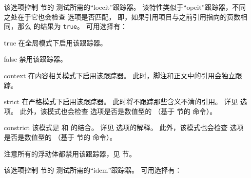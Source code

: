 \begin{optionlist}
该选项控制  节的  测试所需的“loccit”跟踪器。
该特性类似于“opcit”跟踪器，不同之处在于它也会检查  选项是否匹配，
即，如果引用项目与之前引用指向的页数相同，那么  的结果为 \texttt{true}。
可用选择有：

\begin{valuelist}
\item[true] %
在全局模式下启用该跟踪器。
\item[false] %
禁用该跟踪器。
\item[context] %
在内容相关模式下启用该跟踪器。
此时，脚注和正文中的引用会独立跟踪。
\item[strict] %
在严格模式下启用该跟踪器。
此时将不跟踪那些含义不清的引用。
详见  选项。
此外，该模式也会检查  选项是否是数值型的
（基于  节的  命令）。
\item[constrict] %
该模式是  和  的结合。
详见   选项的解释。
此外，该模式也会检查  选项是否是数值型的
（基于  节的  命令）。
\end{valuelist}

注意所有的浮动体都禁用该跟踪器，见  节。



该选项控制  节的  测试所需的“idem”跟踪器。
可用选择有：


\end{optionlist}
